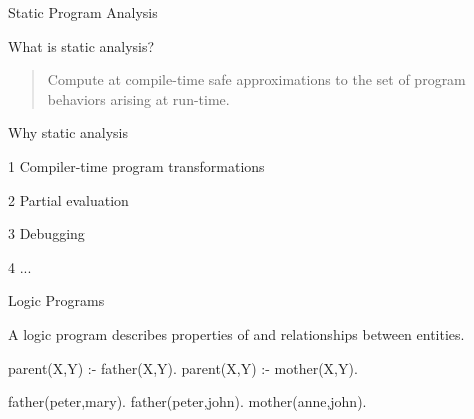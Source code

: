 \documentclass{beamer}
\newenvironment{tightdescription}{\begin{description}%
                          \setlength{\parskip 0pt}%
                          \setlength{\topsep 0pt}%
                          \setlength{\itemsep 2pt}%
                          \setlength{\partopsep 0pt}}%
                         {\end{description}}
\def\pspace{\vspace*{\fill}}
\begin{document}
\begin{frame}{Static Program Analysis}
\pspace

\begin{minipage}[t]{.45\textwidth}
What is static analysis?
\begin{quote}
Compute at compile-time safe approximations to the set of program
behaviors arising at run-time.
\end{quote}
\end{minipage} \hspace{\fill}
\begin{minipage}[t]{.45\textwidth}
Why static analysis
\begin{tightdescription}
    \item[1] Compiler-time program transformations
    \item[2] Partial evaluation
    \item[3] Debugging
    \item[4] ...
\end{tightdescription}

\end{minipage}



\pspace
\end{frame}


\begin{frame}[fragile]{Logic Programs}
\pspace

\begin{minipage}[t]{.45\textwidth}
A logic program describes properties of and relationships between
entities.
\end{minipage}\hspace{\fill}
\begin{minipage}[t]{.45\textwidth}

\begin{semiverbatim}
parent(X,Y) :- father(X,Y).
parent(X,Y) :- mother(X,Y).

father(peter,mary).
father(peter,john).
mother(anne,john).

\end{semiverbatim}

\end{minipage}



\pspace
\end{frame}
\end{document}
